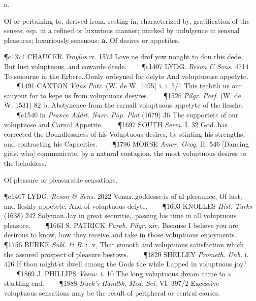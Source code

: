 \begin{description}[wide, labelwidth=!, labelindent=0pt]
\begin{myenumerate}
\end{myenumerate}


 a.

\noindent {}

\noindent [ad. OF. (also mod.F.) voluptueux, -euse (= Sp. and Pg. voluptuoso, It. voluttuoso), or L. voluptuōsus (Pliny, etc.), f. voluptas pleasure, VOLUPTY. Cf. VOLUPTEOUS a.]
\vspace{-0.3cm}

\begin{myenumerate}

 Of or pertaining to, derived from, resting in, characterized by, gratification of the senses, esp. in a refined or luxurious manner; marked by indulgence in sensual pleasures; luxuriously sensuous: \textbf{a.} Of desires or appetites.

\P c1374 CHAUCER \textit{Troylus} iv. 1573 Love  ne drof yow nought to don this dede, But lust voluptuous, and cowarde drede.    
\P c1407 LYDG.  \textit{Reson \& Sens.} 4714 To soiourne in the Erbere..Oonly ordeyned for delyte And voluptuouse appetyte.    
\P 1491 CAXTON  \textit{Vitas Patr.} (W. de W. 1495) i. i. 5/1 This techith us our sauyour for to kepe us from voluptuous desyres.    
\P 1526  \textit{Pilgr. Perf.} (W. de W. 1531) 82 b, Abstynence from the carnall voluptuous appetyte of the flesshe.    
\P c1540 in  \textit{Prance Addit. Narr. Pop. Plot} (1679) 36 The supporters of our voluptuose and Carnal Appetite.    
\P 1697 SOUTH  \textit{Serm.} I. 32 God..has corrected the Boundlessness of his Voluptuous desires, by stinting his strengths, and contracting his Capacities.    
\P 1796 MORSE  \textit{Amer. Geog.} II. 546 [Dancing girls, who] communicate, by a natural contagion, the most voluptuous desires to the beholders.

 Of pleasure or pleasurable sensations.

\P c1407 LYDG.  \textit{Reson \& Sens.} 2022 Venus..goddesse is of al plesaunce, Of lust, and fleshly appetyte, And of voluptuous delyte.    
\P 1603 KNOLLES  \textit{Hist. Turks} (1638) 242 Solyman..lay in great securitie,..passing his time in all voluptuous pleasure.    
\P 1663 S. PATRICK  \textit{Parab. Pilgr.} xiv, Because I believe you are desirous to know, how they receive and take in those voluptuous enjoyments.    
\P 1756 BURKE  \textit{Subl. \& B.} i. v, That smooth and voluptuous satisfaction which the assured prospect of pleasure bestows.    
\P 1820 SHELLEY  \textit{Prometh. Unb.} i. 426 If thou might'st dwell among the Gods the while Lapped in voluptuous joy?    
\P 1869 J. PHILLIPS  \textit{Vesuv.} i. 10 The long voluptuous dream came to a startling end.    
\P 1888 \textit{Buck's  Handbk. Med. Sci.} VI. 397/2 Excessive voluptuous sensations may be the result of peripheral or central causes.


\end{myenumerate}
\end{description}
